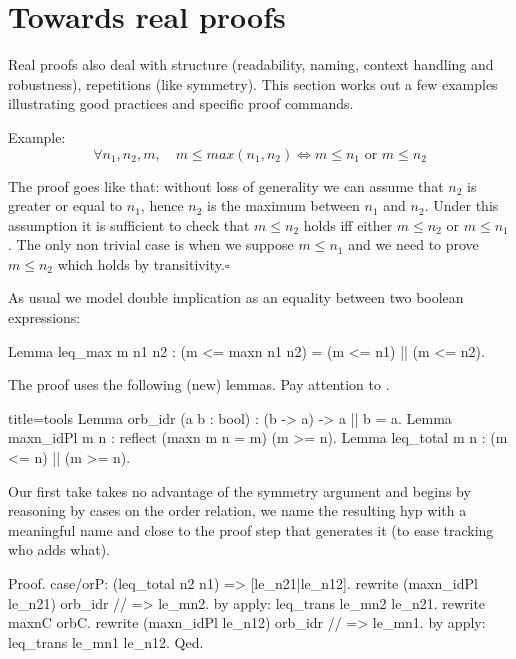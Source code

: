 \section{Towards real proofs}

Real proofs also deal with structure (readability, naming, context handling and
robustness), repetitions (like symmetry).  This section works out a few
examples illustrating good practices and specific proof commands.

Example:
$$
\forall n_1, n_2, m, \quad m \le max(n_1,n_2)
\Leftrightarrow m \le n_1 \textrm{ or } m \le n_2
$$

The proof goes like that: without loss of generality we can assume that
$n_2$ is greater or equal to $n_1$, hence $n_2$ is the maximum between
$n_1$ and $n_2$.  Under this assumption it is sufficient to check
that $m \le n_2$ holds iff either $m \le n_2$ or $m \le n_1$.
The only non trivial case is when we suppose $m \le n_1$ and
we need to prove $m \le n_2$ which holds by transitivity.\hfill$\square$

As usual we model double implication as an equality between two
boolean expressions:

\begin{coq}{}{}
Lemma leq_max m n1 n2 : (m <= maxn n1 n2) = (m <= n1) || (m <= n2).
\end{coq}

The proof uses the following (new) lemmas.  Pay attention to
.

\begin{coq}{}{title=tools}
Lemma orb_idr (a b : bool) : (b -> a) -> a || b = a.
Lemma maxn_idPl {m n} : reflect (maxn m n = m) (m >= n).
Lemma leq_total m n : (m <= n) || (m >= n).
\end{coq}

Our first take takes no advantage of the symmetry argument and
begins by reasoning by cases on the order relation,
we name the resulting hyp with a meaningful name and close to
the proof step that generates it (to ease tracking who adds what).

\begin{coq}{}{}
Proof.
case/orP: (leq_total n2 n1) => [le_n21|le_n12].
  rewrite (maxn_idPl le_n21) orb_idr // => le_mn2.
  by apply: leq_trans le_mn2 le_n21.
rewrite maxnC orbC.
rewrite (maxn_idPl le_n12) orb_idr // => le_mn1.
by apply: leq_trans le_mn1 le_n12.
Qed.
\end{coq}

